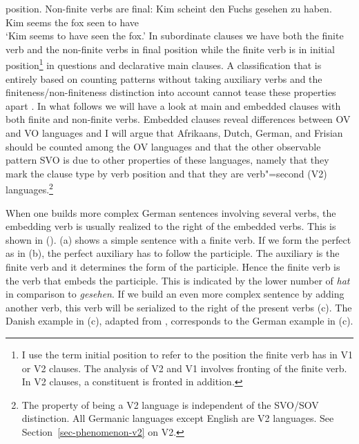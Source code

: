position. Non-finite verbs are final: 
\ea
\gll Kim scheint den Fuchs gesehen zu haben.\\
     Kim seems   the fox  seen to have\\
\glt `Kim seems to have seen the fox.'
\z
In subordinate clauses we have both the finite verb and the non-finite verbs in final position while
the finite verb is in initial position\footnote{%
  I use the term initial position to refer to the position the finite verb has in V1 or V2 clauses. The
  analysis of V2 and V1 involves fronting of the finite verb. In V2 clauses, a constituent is fronted
  in addition.
} in questions and declarative main clauses.
A classification that is entirely based on counting patterns without taking auxiliary verbs and the
finiteness/non-finiteness distinction into account cannot tease these properties apart \citep[Section~3]{HoehleTopo}. In what follows we will have a look at main and embedded clauses with
both finite and non-finite verbs. Embedded clauses reveal differences between OV and VO languages and I will argue that Afrikaans, Dutch,
German, and Frisian should be counted among the OV languages and that the other observable pattern
SVO is due to other properties of these languages, namely that they mark the clause type by verb
position and that they are verb"=second (V2) languages.\footnote{%
  The property of being a V2 language is independent of the SVO/SOV distinction. All Germanic
  languages except English are V2 languages. See Section~\ref{sec-phenomenon-v2} on V2.
}

When one builds more complex German sentences involving several verbs, the embedding verb is usually
realized to the right of the embedded verbs. 
This is shown in (). (a) shows a simple
sentence with a finite verb. If we form the perfect as in (b), the perfect auxiliary has to
follow the participle. The auxiliary is the finite verb and it determines the form of the
participle. Hence the finite verb is the verb that embeds the participle. This is indicated by the
lower number of \emph{hat} in comparison to \emph{gesehen}. If we build an even more complex
sentence by adding another verb, this verb will be serialized to the right of the present verbs
(c).  The Danish example in (c), adapted from \citet[]{Oersnes2009b}, corresponds to the
German example in (c).

